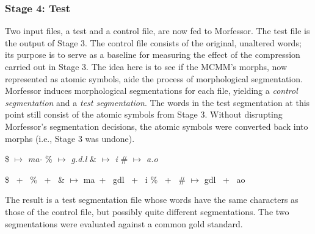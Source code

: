 {{\subsubsection{Stage 4: Test} 
Two input files, a test and a 
control file, are now fed to Morfessor. 
The test file is the output of Stage 3.  %
The control file consists of the original, unaltered words; its purpose is to serve as a baseline for measuring the effect 
of the compression carried out in Stage 3. 
The idea here is to see if the MCMM's morphs, 
now represented as atomic symbols, aide the 
process of morphological segmentation.  %
Morfessor induces morphological segmentations for each file, yielding a \emph{control segmentation} and a \emph{test segmentation}. The words in the test segmentation at this point still consist of the atomic symbols from Stage 3. Without disrupting Morfessor's segmentation decisions, the atomic symbols were converted back into morphs (i.e., Stage 3 was undone).
\begin{exe}
	\ex   \$ $\mapsto$  \textit{ma-}
	\quad \% $\mapsto$ \textit{g.d.l} 
	\quad  \& $\mapsto$ \textit{i}
	\quad  \# $\mapsto$ \textit{a.o}
\label{ex:map}
\end{exe}
\begin{exe}  
	\ex \label{ex:reassembled} \begin{xlist}
	\ex  \$ \, + \, \% \, + \,  \& \quad $\mapsto$ \quad  ma \,+ \, gdl  \, + \, i
	\label{ex:reconverted-magdil}
	\ex  \% \, + \, \# \quad $\mapsto$  \quad gdl \, + \, ao
	\label{ex:reconverted-gadol}
	\end{xlist}
\end{exe}
 The result is a test segmentation file whose words have the same characters as those of the control file, but possibly quite different segmentations. The two segmentations were evaluated against a common gold standard.

}}
